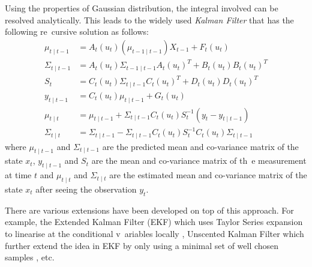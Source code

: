 Using the properties of Gaussian distribution, the integral involved can be resolved analytically. This leads to the widely used \emph{Kalman Filter} \cite{KRE60} that has the following re\
cursive solution as follows:
\begin{align}
  \mu_{t \mid t -1} &= A_{t}(u_t)(\mu_{t-1 \mid t-1})X_{t-1} + F_t(u_t) \\
  \Sigma_{t \mid t -1} &= A_{t}(u_t)\Sigma_{t -1 \mid t -1}A_{t}(u_t)^T +  B_t(u_t)B_t(u_t)^T \\
  S_t &=  C_{t}(u_t)\Sigma_{t \mid t -1}C_{t}(u_t)^T +  D_t(u_t)D_t(u_t)^T \\
  y_{t \mid t-1} &=  C_{t}(u_t)  \mu_{t \mid t-1} + G_t(u_t) \\
  \mu_{t \mid t} &=   \mu_{t \mid t -1} +   \Sigma_{t \mid t -1} C_{t}(u_t)S_t^{-1}(y_t - y_{t \mid t-1}) \\
  \Sigma_{t \mid t} &=  \Sigma_{t \mid t -1} -\Sigma_{t \mid t -1} C_{t}(u_t)S_t^{-1} C_{t}(u_t)\Sigma_{t \mid t -1}
\end{align}
where  $\mu_{t \mid t -1}$ and $\Sigma_{t \mid t -1}$ are the predicted mean and co-variance matrix of the state $x_t$, $y_{t \mid t-1}$ and $S_t$ are the mean and co-variance matrix of th\
e measurement at time $t$ and $\mu_{t \mid t}$ and $\Sigma_{t \mid t}$ are the estimated mean and co-variance matrix of the state $x_t$ after seeing the observation $y_t$.

There are various extensions have been developed on top of this approach. For example, the Extended Kalman Filter (EKF) which uses Taylor Series expansion to linearise at the conditional v\
ariables locally \cite{WG95}, Unscented Kalman Filter which further extend the idea in EKF by only using a minimal set of well chosen samples \cite{EW01}, etc.


